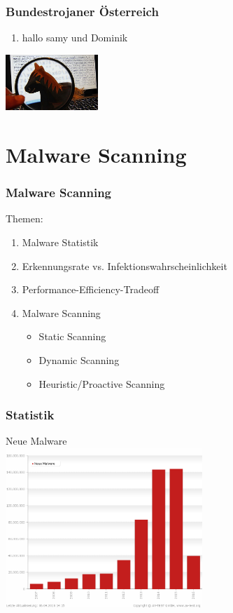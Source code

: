 \documentclass{beamer}
\begin{document}
\begin{frame}
	\frametitle{Bundestrojaner Österreich}
	\begin{enumerate}
		\item hallo samy und Dominik
	\end{enumerate}
	\flushright
	\includegraphics[width= 3.5cm]{bilder/oesterreich.jpg}
\end{frame}


\section{Malware Scanning}
\begin{frame}
\frametitle{Malware Scanning}

\begin{block}{Themen:}
\begin{enumerate}
\item Malware Statistik
\item Erkennungsrate vs. Infektionswahrscheinlichkeit
\item Performance-Efficiency-Tradeoff
\item Malware Scanning
\begin{itemize}
\item Static Scanning
\item Dynamic Scanning
\item Heuristic/Proactive Scanning
\end{itemize}
\end{enumerate}
\end{block}
\end{frame}

\begin{frame}
\frametitle{Statistik}

Neue Malware \\
\includegraphics[height=6cm]{bilder/growth.png}
\end{frame}
\end{document}
